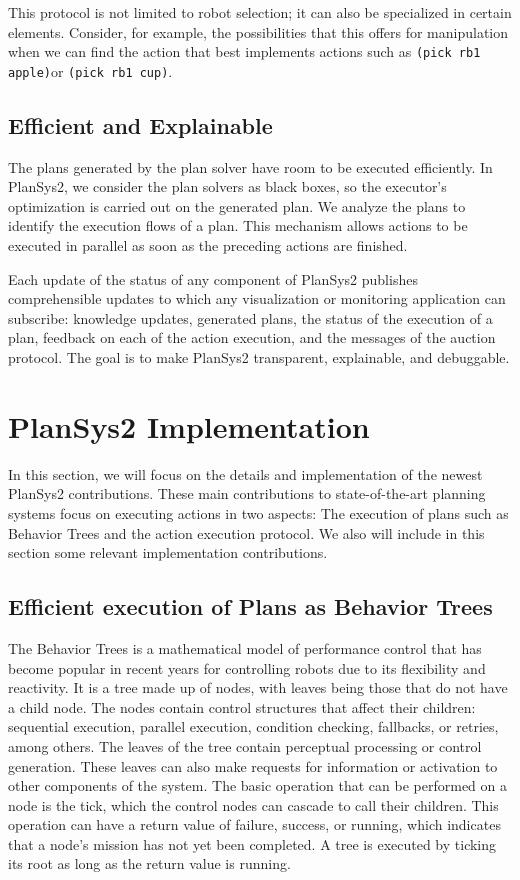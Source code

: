 \documentclass[letterpaper, 10 pt, conference]{IEEEtran}
\begin{document}
This protocol is not limited to robot selection; it can also be specialized in certain elements. Consider, for example, the possibilities that this offers for manipulation when we can find the action that best implements actions such as \small\texttt{(pick rb1 apple)}\normalsize or \small\texttt{(pick rb1 cup)}\normalsize.

\subsection{Efficient and Explainable}

The plans generated by the plan solver have room to be executed efficiently. In PlanSys2, we consider the plan solvers as black boxes, so the executor's optimization is carried out on the generated plan. We analyze the plans to identify the execution flows of a plan. This mechanism allows actions to be executed in parallel as soon as the preceding actions are finished.

Each update of the status of any component of PlanSys2 publishes comprehensible updates to which any visualization or monitoring application can subscribe: knowledge updates, generated plans, the status of the execution of a plan, feedback on each of the action execution, and the messages of the auction protocol. The goal is to make PlanSys2 transparent, explainable, and debuggable.

\section{PlanSys2 Implementation}
\label{sec:implementation}

In this section, we will focus on the details and implementation of the newest PlanSys2 contributions. These main contributions to state-of-the-art planning systems focus on executing actions in two aspects: The execution of plans such as Behavior Trees and the action execution protocol. We also will include in this section some relevant implementation contributions.

\subsection{Efficient execution of Plans as Behavior Trees}

The Behavior Trees is a mathematical model of performance control that has become popular in recent years for controlling robots due to its flexibility and reactivity. It is a tree made up of nodes, with leaves being those that do not have a child node. The nodes contain control structures that affect their children: sequential execution, parallel execution, condition checking, fallbacks, or retries, among others. The leaves of the tree contain perceptual processing or control generation. These leaves can also make requests for information or activation to other components of the system. The basic operation that can be performed on a node is the tick, which the control nodes can cascade to call their children. This operation can have a return value of failure, success, or running, which indicates that a node's mission has not yet been completed. A tree is executed by ticking its root as long as the return value is running.
\end{document}
